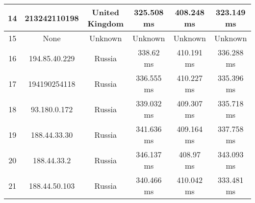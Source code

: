 \begin{table}[H]
\begin{tabular}{ | c | c | c | c | c | c | }
14	&213242110198	  & United Kingdom   	    & 325.508 ms     	     &408.248 ms     	     &323.149 ms     \\ \hline
15	&None           &     	      Unknown    &   	      Unknown     &  	      Unknown     &  	      Unknown   \\ \hline    
16	&194.85.40.229  &     	       Russia    &   	      338.62 ms   &  	     410.191 ms   &  	     336.288 ms \\ \hline    
17	&194190254118	  &     Russia       	    & 336.555 ms     	     &410.227 ms     	     &335.396 ms     \\ \hline
18	&93.180.0.172   &     	       Russia    &   	     339.032 ms   &  	     409.307 ms   &  	     335.718 ms \\ \hline    
19	&188.44.33.30   &     	       Russia    &   	     341.636 ms   &  	     409.164 ms   &  	     337.758 ms \\ \hline    
20	&188.44.33.2    &     	       Russia    &   	     346.137 ms   &  	      408.97 ms   &  	     343.093 ms \\ \hline    
21	&188.44.50.103  &     	       Russia    &   	     340.466 ms   &  	     410.042 ms   &  	     333.481 ms \\ \hline     

\end{tabular}
\end{table}
